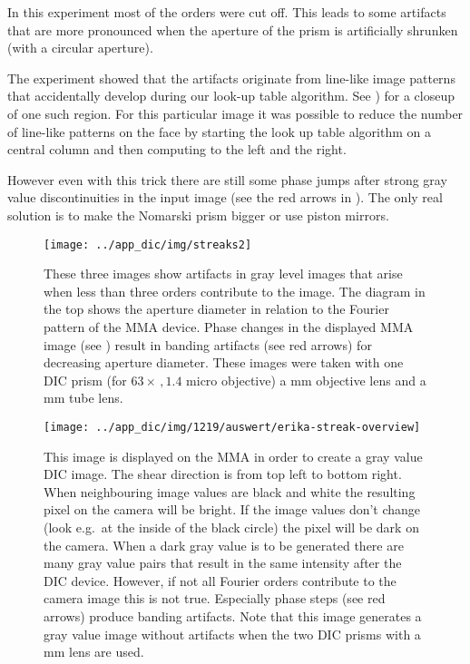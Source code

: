 In this experiment most of the orders were cut off. This leads to some
artifacts that are more pronounced when the aperture of the prism is
artificially shrunken (with a circular aperture).

The experiment showed that the artifacts originate from line-like
image patterns that accidentally develop during our look-up table
algorithm. See ) for a closeup of
one such region.  For this particular image it was possible to reduce
the number of line-like patterns on the face by starting the look up
table algorithm on a central column and then computing to the left and
the right.

However even with this trick there are still some phase jumps after
strong gray value discontinuities in the input image (see the red
arrows in ). The only real solution
is to make the Nomarski prism bigger or use piston mirrors.

\begin{figure}[htb]
  \centering
  \texttt{[image: ../app\_dic/img/streaks2]}
  \caption{These three images show artifacts in gray level images that
    arise when less than three orders contribute to the image. The
    diagram in the top shows the aperture diameter in relation to the
    Fourier pattern of the MMA device. Phase changes in the displayed
    MMA image (see ) result in
    banding artifacts (see red arrows) for decreasing aperture
    diameter. These images were taken with one DIC prism (for
    $63\times\,,1.4$ micro objective) a \unit[200]{mm} objective lens
    and a \unit[500]{mm} tube lens.}
  \label{fig:erikas}
\end{figure}

\begin{figure}[p]
  \centering
  \texttt{[image: ../app\_dic/img/1219/auswert/erika-streak-overview]}
  \caption{This image is displayed on the MMA in order to create a
    gray value DIC image. The shear direction is from top left to
    bottom right. When neighbouring image values are black and white
    the resulting pixel on the camera will be bright. If the image
    values don't change (look e.g.\ at the inside of the black circle)
    the pixel will be dark on the camera. When a dark gray value is to
    be generated there are many gray value pairs that result in the
    same intensity after the DIC device. However, if not all Fourier
    orders contribute to the camera image this is not true. Especially
    phase steps (see red arrows) produce banding artifacts. Note that
    this image generates a gray value image without artifacts when the
    two DIC prisms with a \unit[100]{mm} lens are used.}
  \label{fig:erika-streak-overview}
\end{figure}

